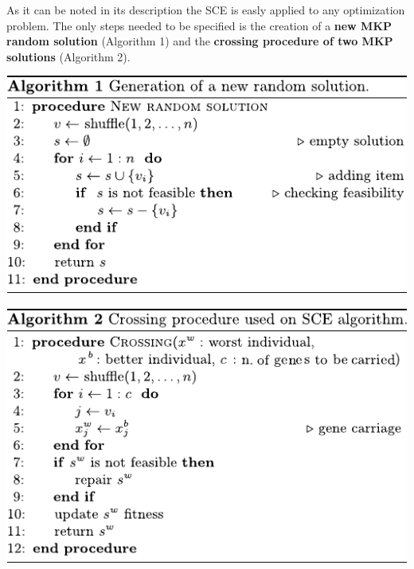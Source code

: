 As it can be noted in its description the SCE is easly applied to any
optimization problem.
The only steps needed to be specified is the creation of a {\bf new MKP random
solution} (Algorithm 1) and the {\bf crossing procedure of two MKP solutions} (Algorithm 2).
\begin{center}
\hspace*{-28pt}
\begin{minipage}[c]{0.5\linewidth}
  \begin{center}
    \includegraphics[width=0.87\linewidth]{imgs/alg-new}\\[3mm]
  \end{center}
\end{minipage}
\begin{minipage}[c]{0.4\linewidth}
  \begin{center}
    \includegraphics[width=0.95\linewidth]{imgs/alg-cross}
  \end{center}
\end{minipage}
\end{center}
